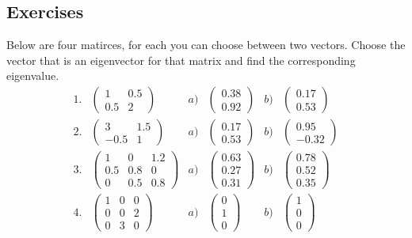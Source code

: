 \documentclass[a4paper]{report}
\begin{document}
\subsection{Exercises}
\begin{Exercise}[label=eigen,title=Which of the two?, difficulty=1]
Below are four matirces, for each you can choose between two vectors. Choose the vector that is an eigenvector for that matrix and find the corresponding eigenvalue.
\begin{align*}
1.& \begin{pmatrix} 1&0.5\\0.5&2\end{pmatrix} & a)& \begin{pmatrix}0.38\\0.92 \end{pmatrix}& b)& \begin{pmatrix}0.17\\0.53 \end{pmatrix}\\
2.& \begin{pmatrix} 3&1.5\\-0.5&1\end{pmatrix} & a)& \begin{pmatrix}0.17\\0.53 \end{pmatrix}& b)& \begin{pmatrix}0.95\\-0.32 \end{pmatrix}\\
3.& \begin{pmatrix} 1&0&1.2\\0.5&0.8&0\\0&0.5&0.8\end{pmatrix} & a)& \begin{pmatrix}0.63\\0.27\\0.31 \end{pmatrix}& b)& \begin{pmatrix}0.78\\0.52\\0.35 \end{pmatrix}\\
4.& \begin{pmatrix} 1&0&0\\0&0&2\\0&3&0\end{pmatrix} & a)& \begin{pmatrix}0\\1\\0 \end{pmatrix}& b)& \begin{pmatrix}1\\0\\ 0\end{pmatrix}\\
\end{align*}
\end{Exercise}
\end{document}
